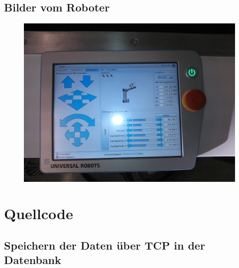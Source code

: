 \section{Bilder vom Roboter}
\label{pic_of_robot}

\begin{figure}[H]
  \centering
    \includegraphics[width=1\textwidth]{pic/tablet.jpg}
      \caption[Soll und Ist Werte der Position des 2.Gelenks]{}
      \label{fig:tablet_picture}
\end{figure}


\chapter{Quellcode}
\label{quellcode}

\section{Speichern der Daten über TCP in der Datenbank}
\label{save_data_tcp_code_gru}

